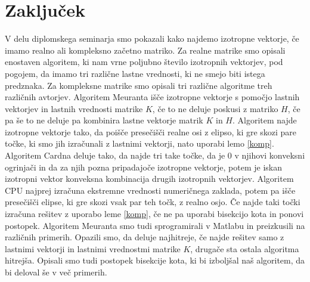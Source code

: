 \documentclass[12pt,a4paper]{amsart}
\theoremstyle{definition}
\theoremstyle{plain}
\begin{document}

\section{Zaključek}
V delu diplomskega seminarja smo pokazali kako najdemo izotropne vektorje, če imamo realno ali kompleksno začetno matriko. Za realne matrike smo opisali enostaven algoritem, ki nam vrne poljubno število izotropnih vektorjev, pod pogojem, da imamo tri različne lastne vrednosti, ki ne smejo biti istega predznaka. Za kompleksne matrike smo opisali tri različne algoritme treh različnih avtorjev. Algoritem Meuranta išče izotropne vektorje s pomočjo lastnih vektorjev in lastnih vrednosti matrike $K$, če to ne deluje poskusi z matriko $H$, če pa še to ne deluje pa kombinira lastne vektorje matrik $K$ in $H$. Algoritem najde izotropne vektorje tako, da poišče presečišči realne osi z elipso, ki gre skozi pare točke, ki smo jih izračunali z lastnimi vektorji, nato uporabi lemo \ref{komp}. Algoritem Cardna deluje tako, da najde tri take točke, da je 0 v njihovi konveksni ogrinjači in da za njih pozna pripadajoče izotropne vektorje, potem je iskan izotropni vektor konveksna kombinacija drugih izotropnih vektorjev. Algoritem CPU najprej izračuna ekstremne vrednosti numeričnega zaklada, potem pa išče presečišči elipse, ki gre skozi vsak par teh točk, z realno osjo. Če najde taki točki izračuna rešitev z uporabo leme \ref{komp}, če ne pa uporabi bisekcijo kota in ponovi postopek. Algoritem Meuranta smo tudi sprogramirali v Matlabu in preizkusili na različnih primerih. Opazili smo, da deluje najhitreje, če najde rešitev samo z lastnimi vektorji in lastnimi vrednostmi matrike $K$, drugače sta ostala algoritma hitrejša. Opisali smo tudi postopek bisekcije kota, ki bi izboljšal naš algoritem, da bi deloval še v več primerih.
\newpage
\end{document}
